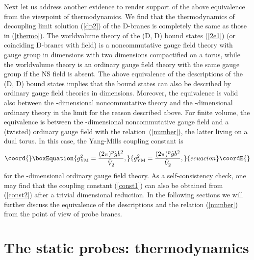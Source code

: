 \documentclass[a4paper,12pt]{article}
\providecommand{\sect}[1]{\setcounter{equation}{0}\section{#1}}
\begin{document}
Next let us address another evidence to render support of the above
equivalence from the viewpoint of thermodynamics. We find that the
thermodynamics of decoupling limit solution (\ref{dp2}) of the D\coordHE{}-branes
is completely the same as those in (\ref{thermo}). The worldvolume theory of
the (D\coordHE{}, D\coordHE{}) bound states (\ref{2e1}) (or \coordHE{} coinciding D\coordHE{}-branes
with \coordHE{} field) is a noncommutative gauge field theory with gauge group
\coordHE{} in \coordHE{} dimensions with two dimensions compactified on a torus,
while the worldvolume theory is an ordinary gauge field theory with the
same gauge group \coordHE{} if the NS \coordHE{} field is absent. The above
equivalence of the descriptions of the (D\coordHE{}, D\coordHE{}) bound states
implies that the bound states can also be described by ordinary gauge field
theories in \coordHE{} dimensions. Moreover, the equivalence is valid also
between the \coordHE{}-dimensional noncommutative \coordHE{} theory and the
\coordHE{}-dimensional \coordHE{} ordinary theory in the limit \coordHE{} for the reason described above. For finite volume, the
equivalence is between the \coordHE{}-dimensional noncommutative \coordHE{} gauge
field and a (twisted) ordinary \coordHE{} gauge field with the
relation~(\ref{number}), the latter living on a dual torus. In this case,
the Yang-Mills coupling constant is
\begin{equation}\coord{}\boxEquation{
\label{const2}
g^2_{\rm YM}=\frac{(2\pi)^p \tilde{g}\tilde{b}^2}{\tilde{V}_2},
}{
g^2_{\rm YM}=\frac{(2\pi)^p \tilde{g}\tilde{b}^2}{\tilde{V}_2},
}{ecuacion}\coordE{}\end{equation}
for the \coordHE{}-dimensional ordinary gauge field theory. As a self-consistency
check, one may find that the coupling constant (\ref{const1}) can also be
obtained from (\ref{const2}) after a trivial dimensional reduction. In the
following sections we will further discuss the equivalence of the descriptions
and the relation (\ref{number}) from the point of view of probe branes.


\sect{The static probes: thermodynamics}
\end{document}
